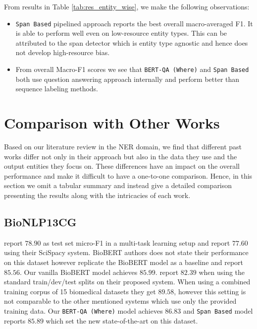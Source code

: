 From results in Table \ref{tab:res_entity_wise}, we make the following observations:
\begin{itemize}
    \item \texttt{Span Based} pipelined approach reports the best overall macro-averaged F1. It is able to perform well even on low-resource entity types. This can be attributed to the span detector which is entity type agnostic and hence does not develop high-resource bias.
    
    \item From overall Macro-F1 scores we see that \texttt{BERT-QA (Where)} and \texttt{Span Based} both use question answering approach internally and perform better than sequence labeling methods. 
    
\end{itemize}

\section{Comparison with Other Works}
\label{sec:sota_comparison}
Based on our literature review in the NER domain, we find that different past works differ not only in their approach but also in the data they use and the output entities they focus on. These differences have an impact on the overall performance and make it difficult to have a one-to-one comparison. Hence, in this section we omit a tabular summary and instead give a detailed comparison presenting the results along with the intricacies of each work. 

\subsection{BioNLP13CG}
\cite{crichton2017neural} report $78.90$ as test set micro-F1 in a multi-task learning setup and \cite{neumann2019scispacy} report $77.60$ using their SciSpacy system. BioBERT\cite{lee2020biobert} authors does not state their performance on this dataset however \cite{banerjee2019knowledge} replicate the BioBERT model as a baseline and report $85.56$. Our vanilla BioBERT model achieves $85.99$. \cite{banerjee2019knowledge} report $82.39$ when using the standard train/dev/test splits on their proposed system. When using a combined training corpus of 15 biomedical datasets they get $89.58$, however this setting is not comparable to the other mentioned systems which use only the provided training data. Our \texttt{BERT-QA (Where)} model achieves $86.83$ and \texttt{Span Based} model reports $85.89$ which set the new state-of-the-art on this dataset.

